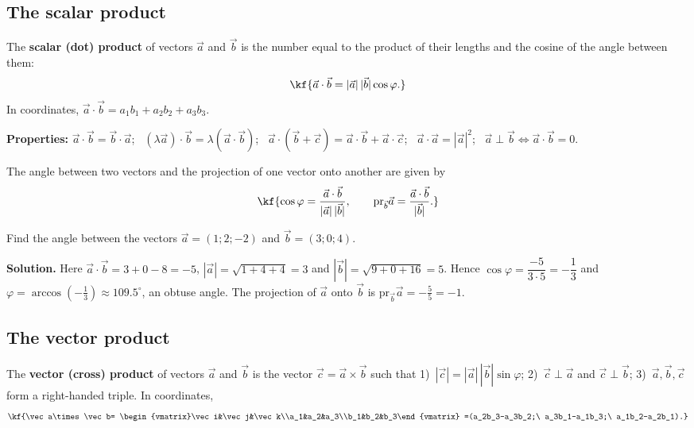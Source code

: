 
\subsection{The scalar product}

\begin{tarif}
The \textbf{scalar (dot) product} of vectors $\vec a$ and $\vec b$ is the
number equal to the product of their lengths and the cosine of the angle
between them:
\[\kf{\vec a\cdot\vec b=|\vec a|\,|\vec b|\cos\varphi .}\]
In coordinates, $\vec a\cdot\vec b=a_1b_1+a_2b_2+a_3b_3$.
\end{tarif}

\textbf{Properties:} $\vec a\cdot\vec b=\vec b\cdot\vec a$; \
$(\lambda\vec a)\cdot\vec b=\lambda(\vec a\cdot\vec b)$; \
$\vec a\cdot(\vec b+\vec c)=\vec a\cdot\vec b+\vec a\cdot\vec c$; \
$\vec a\cdot\vec a=|\vec a|^2$; \
$\vec a\perp\vec b\iff\vec a\cdot\vec b=0$.

The angle between two vectors and the projection of one vector onto
another are given by
\[\kf{\cos\varphi=\frac{\vec a\cdot\vec b}{|\vec a|\,|\vec b|},\qquad
\mathrm{pr}_{\vec b}\vec a=\frac{\vec a\cdot\vec b}{|\vec b|}.}\]

\begin{misol}
Find the angle between the vectors $\vec a=(1;2;-2)$ and $\vec b=(3;0;4)$.

\textbf{Solution.} Here $\vec a\cdot\vec b=3+0-8=-5$, $|\vec a|=\sqrt{1+4+4}=3$
and $|\vec b|=\sqrt{9+0+16}=5$. Hence
$\cos\varphi=\dfrac{-5}{3\cdot5}=-\dfrac13$ and
$\varphi=\arccos\left(-\frac13\right)\approx109.5^\circ$, an obtuse angle.
The projection of $\vec a$ onto $\vec b$ is $\mathrm{pr}_{\vec b}\vec a=-\frac55=-1$.
\end{misol}

\subsection{The vector product}

\begin{tarif}
The \textbf{vector (cross) product} of vectors $\vec a$ and $\vec b$ is the
vector $\vec c=\vec a\times\vec b$ such that
1)~$|\vec c|=|\vec a|\,|\vec b|\sin\varphi$; 2)~$\vec c\perp\vec a$ and
$\vec c\perp\vec b$; 3)~$\vec a,\vec b,\vec c$ form a right-handed triple.
In coordinates,
\[\kf{\vec a\times\vec b=
\begin{vmatrix}\vec i&\vec j&\vec k\\a_1&a_2&a_3\\b_1&b_2&b_3\end{vmatrix}
=(a_2b_3-a_3b_2;\ a_3b_1-a_1b_3;\ a_1b_2-a_2b_1).}\]
\end{tarif}

